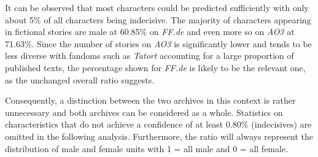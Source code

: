 It can be observed that most characters could be predicted sufficiently with only about 5\% of all characters being indecisive.
The majority of characters appearing in fictional stories are male at 60.85\% on \emph{FF.de} and even more so on \emph{AO3} at 71.63\%.
Since the number of stories on \emph{AO3} is significantly lower and tends to be less diverse with fandoms such as \emph{Tatort} accounting for a large proportion of published texts, the percentage shown for \emph{FF.de} is likely to be the relevant one, as the unchanged overall ratio suggests.

Consequently, a distinction between the two archives in this context is rather unnecessary and both archives can be considered as a whole.
Statistics on characteristics that do not achieve a confidence of at least 0.80\% (indecisives) are omitted in the following analysis.
Furthermore, the ratio will always represent the distribution of male and female units with 1 = all male and 0 = all female.

